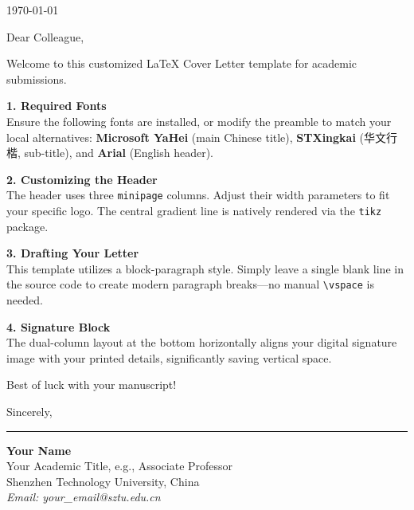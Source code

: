 \documentclass[a4paper,10.5pt]{article}
\begin{document}
\hfill \today

\vspace{1.5em} 

Dear Colleague,

Welcome to this customized LaTeX Cover Letter template for academic submissions. 

\textbf{1. Required Fonts} \\
Ensure the following fonts are installed, or modify the preamble to match your local alternatives: \textbf{Microsoft YaHei} (main Chinese title), \textbf{STXingkai} (华文行楷, sub-title), and \textbf{Arial} (English header).

\textbf{2. Customizing the Header} \\
The header uses three \texttt{minipage} columns. Adjust their width parameters to fit your specific logo. The central gradient line is natively rendered via the \texttt{tikz} package.

\textbf{3. Drafting Your Letter} \\
This template utilizes a block-paragraph style. Simply leave a single blank line in the source code to create modern paragraph breaks—no manual \texttt{\textbackslash vspace} is needed.

\textbf{4. Signature Block} \\
The dual-column layout at the bottom horizontally aligns your digital signature image with your printed details, significantly saving vertical space.

Best of luck with your manuscript!

\vspace{2em} 


Sincerely,

\vspace{0.5em} 

\noindent 
\begin{minipage}[c]{0.25\textwidth}
    \rule{3cm}{1cm}
\end{minipage}
\begin{minipage}[c]{0.7\textwidth}
    \vspace{0.2cm} 
    \textbf{Your Name} \\
    Your Academic Title, e.g., Associate Professor \\
    Shenzhen Technology University, China \\
    \textit{Email: your\_email@sztu.edu.cn}
\end{minipage}
\end{document}
